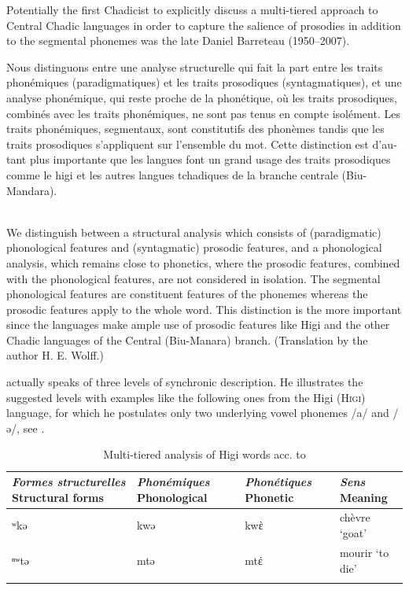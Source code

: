 \documentclass[output=paper]{langscibook}
\begin{document}
Potentially the first Chadicist to explicitly discuss a multi-tiered approach to Central Chadic languages in order to capture the salience of prosodies in addition to the segmental phonemes was the late Daniel Barreteau (1950–2007).

\begin{modquote}
\begin{otherlanguage}{french}
Nous distinguons entre une analyse structurelle qui fait la part entre les traits phonémiques (paradigmatiques) et les traits prosodiques (syntagmatiques), et une analyse phonémique, qui reste proche de la phonétique, où les traits prosodiques, combinés avec les traits phonémiques, ne sont pas tenus en compte isolément. Les traits phonémiques, segmentaux, sont constitutifs des phonèmes tandis que les traits prosodiques s’appliquent sur l’ensemble du mot. Cette distinction est d’autant plus importante que les langues font un grand usage des traits prosodiques comme le higi et les autres langues tchadiques de la branche centrale (Biu-Mandara). \citep[250]{Barreteau1983}
\end{otherlanguage}\smallskip\\
We distinguish between a structural analysis which consists of (paradigmatic) phonological features and (syntagmatic) prosodic features, and a phonological analysis, which remains close to phonetics, where the prosodic features, combined with the phonological features, are not considered in isolation. The segmental phonological features are constituent features of the phonemes whereas the prosodic features apply to the whole word. This distinction is the more important since the languages make ample use of prosodic features like Higi and the other Chadic languages of the Central (Biu-Manara) branch. (Translation by the author H. E. Wolff.)
\end{modquote}

\citet[251]{Barreteau1983} actually speaks of three levels of synchronic description. He illustrates the suggested levels with examples like the following ones from the Higi (\textsc{Higi}) language, for which he postulates only two underlying vowel phonemes /a/ and /ə/, see .

\begin{table}
\caption{Multi-tiered analysis of Higi words acc. to \citet{Barreteau1983}}
\label{tab:wolff:6}
\begin{tabularx}{\textwidth}{QQQQ}
\lsptoprule
 \textit{Formes structurelles}\newline
 Structural forms &
                \textit{Phonémiques}\newline
                Phonological  &  \textit{Phonétiques}\newline
                                Phonetic & \textit{Sens}\newline
                                Meaning\\
 \midrule
 ʷkə & kwə & kwὲ  & chèvre ‘goat’\\
 ⁿʷtə & mtə & mtέ  & mourir ‘to die’\\
\lspbottomrule
\end{tabularx}
\end{table}
\end{document}
